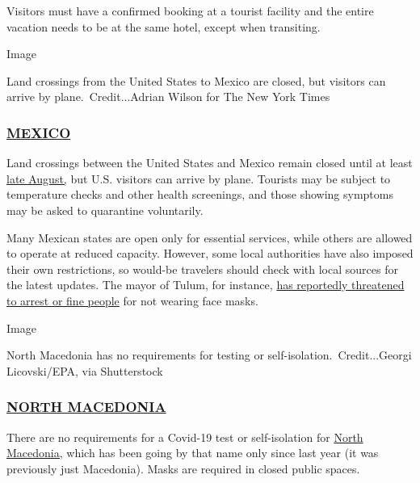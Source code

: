 Visitors must have a confirmed booking at a tourist facility and the
entire vacation needs to be at the same hotel, except when transiting.

Image

Land crossings from the United States to Mexico are closed, but visitors
can arrive by plane.~Credit...Adrian Wilson for The New York Times

\hypertarget{mexico}{%
\subsubsection{\texorpdfstring{\href{https://mx.usembassy.gov/health-alert-u-s-embassy-mexico-city-mexico/}{MEXICO}}{MEXICO}}\label{mexico}}

Land crossings between the United States and Mexico remain closed until
at least
\href{https://www.nytimes.com/aponline/2020/07/16/us/politics/ap-us-virus-outbreak-north-america-borders.html?searchResultPosition=6}{late
August,} but U.S. visitors can arrive by plane. Tourists may be subject
to temperature checks and other health screenings, and those showing
symptoms may be asked to quarantine voluntarily.

Many Mexican states are open only for essential services, while others
are allowed to operate at reduced capacity. However, some local
authorities have also imposed their own restrictions, so would-be
travelers should check with local sources for the latest updates. The
mayor of Tulum, for instance,
\href{https://www.reuters.com/article/us-health-coronavirus-mexico-restriction/mexico-tightens-coronavirus-curbs-in-tourist-spots-other-pockets-idUSKCN24H3E6}{has
reportedly threatened to arrest or fine people} for not wearing face
masks.

Image

North Macedonia has no requirements for testing or
self-isolation.~Credit...Georgi Licovski/EPA, via Shutterstock

\hypertarget{north-macedonia}{%
\subsubsection{\texorpdfstring{\href{https://mk.usembassy.gov/covid-19-information/}{NORTH
MACEDONIA}}{NORTH MACEDONIA}}\label{north-macedonia}}

There are no requirements for a Covid-19 test or self-isolation for
\href{https://www.nytimes.com/2019/05/17/travel/republic-of-north-macedonia-balkans.html}{North
Macedonia,} which has been going by that name only since last year (it
was previously just Macedonia). Masks are required in closed public
spaces.

